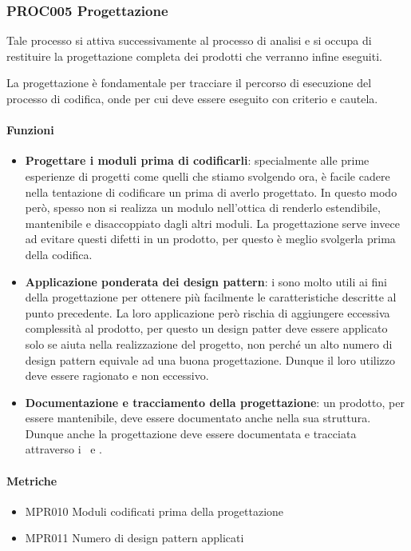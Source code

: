     \subsubsection{PROC005 Progettazione}\label{proc005}
    Tale processo si attiva successivamente al processo di analisi e si occupa di restituire la progettazione completa dei prodotti che verranno infine eseguiti. \par
    La progettazione è fondamentale per tracciare il percorso di esecuzione del processo di codifica, onde per cui deve essere eseguito con criterio e cautela.
    
        \paragraph*{Funzioni}
        \begin{itemize}
            \item \textbf{Progettare i moduli prima di codificarli}: specialmente alle prime esperienze di progetti come quelli che stiamo svolgendo ora, è facile cadere nella tentazione di codificare un  prima di averlo progettato. In questo modo però, spesso non si realizza un modulo nell'ottica di renderlo estendibile, mantenibile e disaccoppiato dagli altri moduli. La progettazione serve invece ad evitare questi difetti in un prodotto, per questo è meglio svolgerla prima della codifica.
            \item \textbf{Applicazione ponderata dei design pattern}: i  sono molto utili ai fini della progettazione per ottenere più facilmente le caratteristiche descritte al punto precedente. La loro applicazione però rischia di aggiungere eccessiva complessità al prodotto, per questo un design patter deve essere applicato solo se aiuta nella realizzazione del progetto, non perché un alto numero di design pattern equivale ad una buona progettazione. Dunque il loro utilizzo deve essere ragionato e non eccessivo.
            \item \textbf{Documentazione e tracciamento della progettazione}: un prodotto, per essere mantenibile, deve essere documentato anche nella sua struttura. Dunque anche la progettazione deve essere documentata e tracciata attraverso i \MUd\ e \MSd.
        \end{itemize}
    
        \paragraph*{Metriche}
        \begin{itemize}
            \item MPR010 Moduli codificati prima della progettazione
            \item MPR011 Numero di design pattern applicati
        \end{itemize}
    

